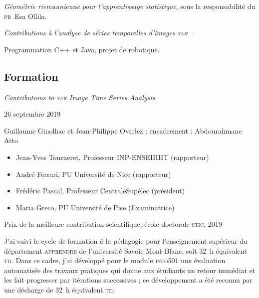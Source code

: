 \emph{Géométrie riemannienne pour l'apprentissage statistique}, sous la
responsabilité du \textsc{pr}~Esa Ollila.

\emph{Contributions à l'analyse de séries temporelles d'images
\textsc{sar}}~.

Programmation C++ et Java, projet de robotique.


\subsection{Formation}
\label{subsec:cv-formation}


\begin{cvfields}
  \item[Titre] \emph{Contributions to \textsc{sar} Image Time Series
    Analysis}~
  \item[Soutenance] 26 septembre 2019
  \item[Direction] Guillaume Ginolhac et Jean-Philippe Ovarlez ;
    encadrement : Abdourahmane Atto
  \item[Jury]     
    \begin{itemize}[label=$\bullet$]
        \item Jean-Yves Tourneret, Professeur INP-ENSEIHHT  (rapporteur)
        \item André Ferrari, PU Université de Nice (rapporteur)
        \item Frédéric Pascal, Professeur CentraleSupélec (président)
        \item Maria Greco, PU Université de Pise (Examinatrice)
    \end{itemize}
  \item[Distinction] Prix de la meilleure contribution scientifique, école
    doctorale \textsc{stic}, 2019
\end{cvfields}



J'ai suivi le cycle de formation à la pédagogie pour l'enseignement supérieur du
département \textsc{apprendre} de l'université Savoie Mont-Blanc, soit 32~h
équivalent \textsc{td}. Dans ce cadre, j'ai développé pour le module
\textsc{info}501 une évaluation automatisée des travaux pratiques qui donne aux
étudiants un retour immédiat et les fait progresser par itérations successives ;
ce développement a été reconnu par une décharge de 32~h équivalent \textsc{td}.


